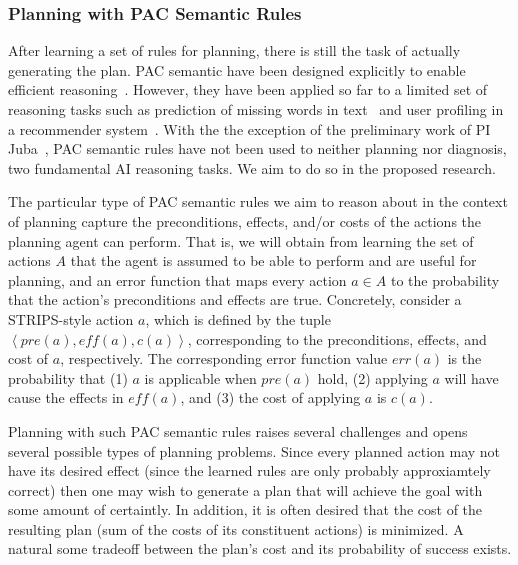 \documentclass[12pt]{article}
\newcommand{\note}[1]{\textbf{\textit{#1}}}
\newcommand{\tuple}[1]{\ensuremath{\left \langle #1 \right \rangle }}
\newcommand{\eff}{\textit{eff}}
\newcommand{\pre}{\textit{pre}}
\begin{document}
\subsubsection{Planning with PAC Semantic Rules}


After learning a set of rules for planning, there is still the task of actually generating the plan. PAC semantic have been designed explicitly to enable efficient reasoning~\cite{valiant2000robustLogics}. However, they have been applied so far to a limited set of reasoning tasks such as prediction of missing words in text~\cite{michael2008first} and user profiling in a recommender system~\cite{semeraro2009knowledge}. With the the exception of the preliminary work of PI Juba~\cite{juba2016aaai,juba2016jmlr}, PAC semantic rules have not been used to neither planning nor diagnosis, two fundamental AI reasoning tasks. We aim to do so in the proposed research. 


The particular type of PAC semantic rules we aim to reason about in the context of planning capture the preconditions, effects, and/or costs of the actions the planning agent can perform. 
That is, we will obtain from learning the set of actions $A$ that the agent is assumed to be able to perform and are useful for planning, 
and an error function that maps every action $a\in A$ 
to the probability that the action's preconditions and effects are true.
Concretely, consider a STRIPS-style action $a$, which is defined by the tuple $\tuple{\pre(a), \eff(a), c(a)}$, corresponding to the preconditions, effects, and cost of $a$, respectively. The corresponding error function value $err(a)$ is the probability that (1) $a$ is applicable when $\pre(a)$ hold, (2) applying $a$ will have cause the effects in $\eff(a)$, and (3) the cost of applying $a$ is $c(a)$. 



Planning with such PAC semantic rules raises several challenges and opens several possible types of planning problems.
Since every planned action may not have its desired effect (since the learned rules are only probably approxiamtely correct)
then one may wish to generate a plan that will achieve the goal with some amount of certaintly. In addition, it is often desired that the cost of the resulting plan (sum of the costs of its constituent actions) is minimized. A natural some tradeoff between the plan's cost  and its probability of success exists. 
\end{document}
